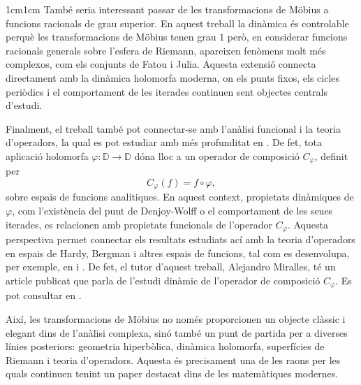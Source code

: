 \begin{adjustwidth}{1cm}{1cm}
També seria interessant passar de les transformacions de Möbius a funcions racionals de grau superior. En aquest treball la dinàmica és controlable perquè les transformacions de Möbius tenen grau $1$ però, en considerar funcions racionals generals sobre l'esfera de Riemann, apareixen fenòmens molt més complexos, com els conjunts de Fatou i Julia. Aquesta extensió connecta directament amb la dinàmica holomorfa moderna, on els punts fixos, els cicles periòdics i el comportament de les iterades continuen sent objectes centrals d'estudi.

Finalment, el treball també pot connectar-se amb l'anàlisi funcional i la teoria d'operadors, la qual es pot estudiar amb més profunditat en \cite{wojtaszczyk}. De fet, tota aplicació holomorfa $\varphi : \mathbb{D} \to \mathbb{D}$ dóna lloc a un operador de composició $C_\varphi$, definit per
\[
C_\varphi(f)=f\circ \varphi,
\]
sobre espais de funcions analítiques. En aquest context, propietats dinàmiques de $\varphi$, com l'existència del punt de Denjoy-Wolff o el comportament de les seues iterades, es relacionen amb propietats funcionals de l'operador $C_\varphi$. Aquesta perspectiva permet connectar els resultats estudiats ací amb la teoria d'operadors en espais de Hardy, Bergman i altres espais de funcions, tal com es desenvolupa, per exemple, en \cite{shapiro} i \cite{zhu}. De fet, el tutor d'aquest treball, Alejandro Miralles, té un article publicat que parla de l'estudi dinàmic de l'operador de composició $C_{\varphi}$. Es pot consultar en \cite{miralles}.

Així, les transformacions de Möbius no només proporcionen un objecte clàssic i elegant dins de l'anàlisi complexa, sinó també un punt de partida per a diverses línies posteriors: geometria hiperbòlica, dinàmica holomorfa, superfícies de Riemann i teoria d'operadors. Aquesta és precisament una de les raons per les quals continuen tenint un paper destacat dins de les matemàtiques modernes.







\end{adjustwidth}